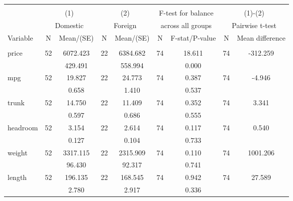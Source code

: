
\begin{tabular}{@{\extracolsep{5pt}}lcccccccc}
\\[-1.8ex]\hline \hline \\[-1.8ex]
 & \multicolumn{2}{c}{(1)}  & \multicolumn{2}{c}{(2)}  & \multicolumn{2}{c}{F-test for balance} & \multicolumn{2}{c}{(1)-(2)} \\
 & \multicolumn{2}{c}{Domestic}  & \multicolumn{2}{c}{Foreign}  & \multicolumn{2}{c}{across all groups} & \multicolumn{2}{c}{Pairwise t-test}  \\
Variable & N & Mean/(SE) & N & Mean/(SE) & N & F-stat/P-value & N & Mean difference \\ \hline \\[-1.8ex] 
price   & 52    &  6072.423    & 22    &  6384.682    & 74    &    18.611    & 74    &  -312.259   \\
 &   &   429.491  &   &   558.994  &   &     0.000  &   &   \\
mpg   & 52    &    19.827    & 22    &    24.773    & 74    &     0.387    & 74    &    -4.946   \\
 &   &     0.658  &   &     1.410  &   &     0.537  &   &   \\
trunk   & 52    &    14.750    & 22    &    11.409    & 74    &     0.352    & 74    &     3.341   \\
 &   &     0.597  &   &     0.686  &   &     0.555  &   &   \\
headroom   & 52    &     3.154    & 22    &     2.614    & 74    &     0.117    & 74    &     0.540   \\
 &   &     0.127  &   &     0.104  &   &     0.733  &   &   \\
weight   & 52    &  3317.115    & 22    &  2315.909    & 74    &     0.110    & 74    &  1001.206   \\
 &   &    96.430  &   &    92.317  &   &     0.741  &   &   \\
length   & 52    &   196.135    & 22    &   168.545    & 74    &     0.942    & 74    &    27.589   \\
 &   &     2.780  &   &     2.917  &   &     0.336  &   &   \\

\end{tabular}
